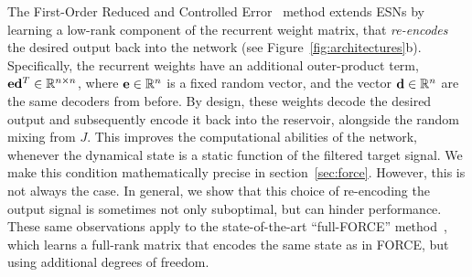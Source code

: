 The First-Order Reduced and Controlled Error~\citep[FORCE;][]{sussillo2009generating} method extends ESNs by learning a low-rank component of the recurrent weight matrix, that {\it re-encodes} the desired output back into the network (see Figure~\ref{fig:architectures}b).
Specifically, the recurrent weights have an additional outer-product term, $\mathbf{e} \mathbf{d}^T \in \mathbb{R}^{n \times n}$, where $\mathbf{e} \in \mathbb{R}^n$ is a fixed random vector, and the vector $\mathbf{d} \in \mathbb{R}^n$ are the same decoders from before.
By design, these weights decode the desired output and subsequently encode it back into the reservoir, alongside the random mixing from $J$.
This improves the computational abilities of the network, whenever the dynamical state is a static function of the filtered target signal.
We make this condition mathematically precise in section~\ref{sec:force}.
However, this is not always the case. In general, we show that this choice of re-encoding the output signal is sometimes not only suboptimal, but can hinder performance.
These same observations apply to the state-of-the-art ``full-FORCE'' method~\citep{depasquale2018full}, which learns a full-rank matrix that encodes the same state as in FORCE, but using additional degrees of freedom.

